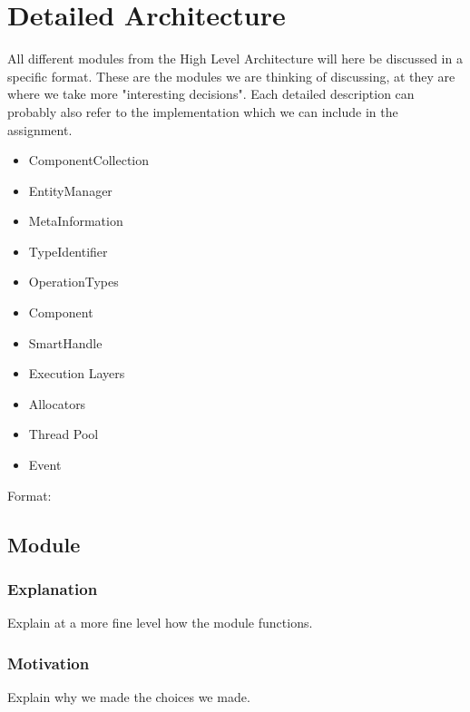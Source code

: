 \section{Detailed Architecture}
All different modules from the High Level Architecture will here be discussed in a specific format.
These are the modules we are thinking of discussing, at they are where we take more "interesting decisions".
Each detailed description can probably also refer to the implementation which we can include in the assignment.

\begin{itemize}
    \item
    ComponentCollection

    \item
    EntityManager

    \item
    MetaInformation

    \item
    TypeIdentifier

    \item
    OperationTypes

    \item
    Component

    \item
    SmartHandle

    \item
    Execution Layers

    \item
    Allocators

    \item
    Thread Pool

    \item
    Event
\end{itemize}

Format:

\subsection{Module}
\subsubsection{Explanation}
Explain at a more fine level how the module functions.

\subsubsection{Motivation}
Explain why we made the choices we made.

